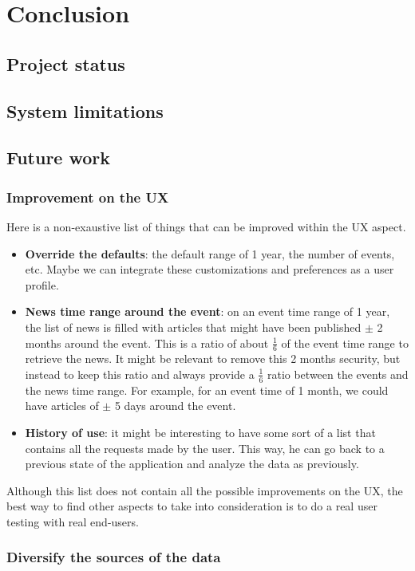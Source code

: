 \chapter{Conclusion}
\label{chapter:conclusions}

\section{Project status}

\section{System limitations}

\section{Future work}

\subsection{Improvement on the UX}
Here is a non-exaustive list of things that can be improved within the UX aspect.
\begin{itemize}
    \item \textbf{Override the defaults}: the default range of 1 year, the number of events, etc. Maybe we can integrate these customizations and preferences as a user profile.
    \item \textbf{News time range around the event}: on an event time range of 1 year, the list of news is filled with articles that might have been published $\pm$ 2 months around the event. This is a ratio of about $\frac{1}{6}$ of the event time range to retrieve the news. It might be relevant to remove this 2 months security, but instead to keep this ratio and always provide a $\frac{1}{6}$ ratio between the events and the news time range. For example, for an event time of 1 month, we could have articles of $\pm$ 5 days around the event.
    \item \textbf{History of use}: it might be interesting to have some sort of a list that contains all the requests made by the user. This way, he can go back to a previous state of the application and analyze the data as previously.
\end{itemize}

Although this list does not contain all the possible improvements on the UX, the best way to find other aspects to take into consideration is to do a real user testing with real end-users.

\subsection{Diversify the sources of the data}
